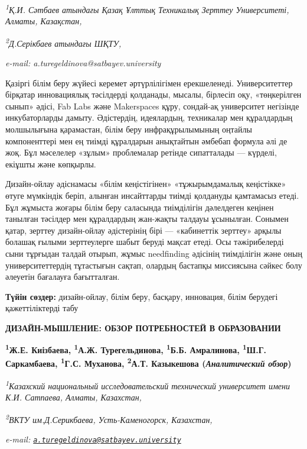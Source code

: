 \begin{affiliation}
\emph{\textsuperscript{1}Қ.И. Сәтбаев атындағы Қазақ Ұлттық Техникалық Зерттеу Университеті, Алматы, Казақстан,}

\emph{\textsuperscript{2}Д.Серікбаев атындағы ШҚТУ,}

\emph{e-mail: a.turegeldinova@satbayev.university}
\end{affiliation}

Қазіргі білім беру жүйесі керемет әртүрлілігімен ерекшеленеді.
Университеттер бірқатар инновациялық тәсілдерді қолданады, мысалы,
бірлесіп оқу, «төңкерілген сынып» әдісі, Fab Labs және Makerspaces құру,
сондай-ақ университет негізінде инкубаторларды дамыту. Әдістердің,
идеялардың, техникалар мен құралдардың молшылығына қарамастан, білім
беру инфрақұрылымының оңтайлы компоненттері мен ең тиімді құралдарын
анықтайтын әмбебап формула әлі де жоқ. Бұл мәселелер «зұлым» проблемалар
ретінде сипатталады --- күрделі, екіұшты және көпқырлы.

Дизайн-ойлау әдіснамасы «білім кеңістігінен» «тұжырымдамалық кеңістікке»
өтуге мүмкіндік беріп, алынған инсайттарды тиімді қолдануды қамтамасыз
етеді. Бұл жұмыста жоғары білім беру саласында тиімділігін дәлелдеген
кеңінен танылған тәсілдер мен құралдардың жан-жақты талдауы ұсынылған.
Сонымен қатар, зерттеу дизайн-ойлау әдістерінің бірі --- «кабинеттік
зерттеу» арқылы болашақ ғылыми зерттеулерге шабыт беруді мақсат етеді.
Осы тәжірибелерді сыни тұрғыдан талдай отырып, жұмыс needfinding
әдісінің тиімділігін және оның университеттердің тұтастығын сақтап,
олардың бастапқы миссиясына сәйкес болу әлеуетін бағалауға бағытталған.

{\bfseries Түйін сөздер:} дизайн-ойлау, білім беру, басқару, инновация,
білім берудегі қажеттіліктерді табу

\begin{articleheader}
{\bfseries ДИЗАЙН-МЫШЛЕНИЕ: ОБЗОР ПОТРЕБНОСТЕЙ В ОБРАЗОВАНИИ}

{\bfseries  
\textsuperscript{1}Ж.Е. Киізбаева,  
\textsuperscript{1}А.Ж. Турегельдинова\textsuperscript{\envelope },  
\textsuperscript{1}Б.Б. Амралинова,  
\textsuperscript{1}Ш.Г. Саркамбаева,  
\textsuperscript{1}Г.С. Муханова,  
\textsuperscript{2}А.Т. Казыкешова  
(\emph{Аналитический обзор})}
\end{articleheader}

\begin{affiliation}
\emph{\textsuperscript{1}Казахский национальный исследовательский технический университет имени К.И. Сатпаева, Алматы, Казахстан,}

\emph{\textsuperscript{2}ВКТУ им.Д.Серикбаева, Усть-Каменогорск, Казахстан,}

\emph{e-mail: \href{mailto:a.turegeldinova@satbayev.university}{\nolinkurl{a.turegeldinova@satbayev.university}}}
\end{affiliation}

